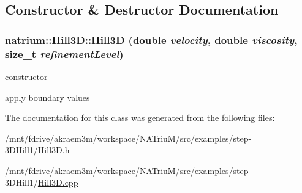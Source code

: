 \subsection{Constructor \& Destructor Documentation}
\hypertarget{classnatrium_1_1Hill3D_a3972f24e6e178a1a7aacf6561c5ac119}{
\subsubsection[{Hill3D}]{\setlength{\rightskip}{0pt plus 5cm}natrium::Hill3D::Hill3D (double {\em velocity}, \/  double {\em viscosity}, \/  size\_\-t {\em refinementLevel})}}
\label{classnatrium_1_1Hill3D_a3972f24e6e178a1a7aacf6561c5ac119}


constructor 

apply boundary values 

The documentation for this class was generated from the following files:\begin{DoxyCompactItemize}
\item 
/mnt/fdrive/akraem3m/workspace/NATriuM/src/examples/step-\/3DHill1/Hill3D.h\item 
/mnt/fdrive/akraem3m/workspace/NATriuM/src/examples/step-\/3DHill1/\hyperlink{Hill3D_8cpp}{Hill3D.cpp}\end{DoxyCompactItemize}
